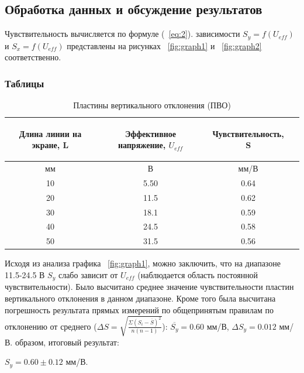 \subsection{Обработка данных и обсуждение результатов}
Чувствительность вычисляется по формуле (~\ref{eq:2}). 
 зависимости $S_y=f(U_{eff})$ и $S_x=f(U_{eff})$ представлены на рисунках ~\ref{fig:graph1} и ~\ref{fig:graph2} соответственно.
\subsubsection{Таблицы}
\begin{center}
\begin{table}[h!]
\centering
\caption{Пластины вертикального отклонения (ПВО)}
\label{tabl:1}
\begin{tabular}{|c|c|c|c|}
\hline
\begin{minipage}{5cm}
\begin{center}
       Длина линии на экране, L
\end{center}
\end{minipage} &
\begin{minipage}{5cm}
\begin{center}
    Эффективное напряжение, $U_{eff}$
    \end{center}
\end{minipage} &
\begin{minipage}{5cm}
\begin{center}
    Чувствительность, S
\end{center}
\end{minipage}\\
\hline
мм&В&мм/В\\
\hline
10  &  5.50  &  0.64 \\
20  &  11.5  &  0.62\\
30  &  18.1  &  0.59 \\
40  &  24.5  &  0.58 \\
50  &  31.5  &  0.56 \\

\hline
\end{tabular}
\end{table}
\end{center}
Исходя из анализа графика ~\ref{fig:graph1}, можно заключить, что на диапазоне 11.5-24.5 В $S_y$ слабо зависит от $U_{eff}$ (наблюдается область постоянной чувствительности). Было высчитано среднее значение чувствительности пластин вертикального отклонения в данном диапазоне. Кроме того была высчитана погрешность результата прямых измерений по общепринятым правилам по отклонению от среднего ($\Delta S=\sqrt{\frac{\Sigma{(S_i-\overline{S})^2}}{n(n-1)}}$): $\overline{S_y}=0.60$ мм/В, $\Delta{S_y}=0.012$ мм/В.
 образом, итоговый результат:
\par$S_y = 0.60 \pm 0.12$ мм/В.

